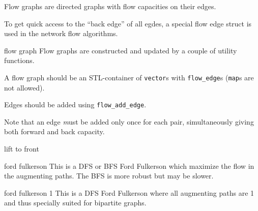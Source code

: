 
Flow graphs are directed graphs with flow capacities on their edges.

To get quick access to the ``back edge'' of all egdes, a special flow edge
struct is used in the network flow algorithms.

\begin{algorithm}{flow graph}
\desc
Flow graphs are constructed and updated by a couple of utility functions.

A flow graph should be an STL-container of {\tt vector}s with
{\tt flow\_edge}s ({\tt map}s are not allowed).

Edges should be added using {\tt flow\_add\_edge}.

Note that an edge {\emph must be} added only once for each pair,
simultaneously giving both forward and back capacity.
\end{algorithm}

\begin{algorithm}{lift to front}
\end{algorithm}

\begin{algorithm}{ford fulkerson}
\desc
This is a DFS or BFS Ford Fulkerson which maximize the flow in the
augmenting paths. The BFS is more robust but may be slower.
\end{algorithm}

\begin{algorithm}{ford fulkerson 1}
\desc
This is a DFS Ford Fulkerson where all augmenting paths
are 1 and thus specially suited for bipartite graphs.
\end{algorithm}

